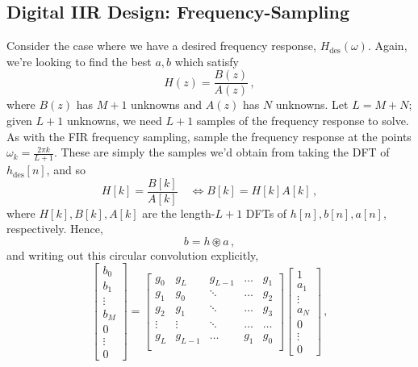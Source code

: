 \subsection{Digital IIR Design: Frequency-Sampling}
%
Consider the case where we have a desired frequency response,
$H_\mathrm{des}(\omega)$. Again, we're looking to find the best
$a, b$ which satisfy
%
\begin{displaymath}
  H(z) = \frac{B(z)}{A(z)} \,,
\end{displaymath}
%
where $B(z)$ has $M+1$ unknowns and $A(z)$ has $N$ unknowns. Let
$L = M + N$; given $L + 1$ unknowns, we need $L + 1$ samples
of the frequency response to solve. As with the FIR frequency
sampling, sample the frequency response at the points
$\omega_k = \frac{2\pi k}{L + 1}$. These are simply the samples
we'd obtain from taking the DFT of $h_\mathrm{des}[n]$, and so
%
\begin{displaymath}
  H[k] = \frac{B[k]}{A[k]} \quad\Longleftrightarrow B[k] = H[k]A[k] \,,
\end{displaymath}
%
where $H[k], B[k], A[k]$ are the length-$L+1$ DFTs of $h[n], b[n], a[n]$,
respectively. Hence,
%
\begin{displaymath}
  b = h \circledast a \,,
\end{displaymath}
%
and writing out this circular convolution explicitly,
%
\begin{displaymath}
  \left[\begin{array}{c} b_0 \\ b_1 \\ \vdots \\ b_M \\ 0 \\ \vdots \\ 0 \end{array}\right]
  =
  \left[\begin{array}{ccccc}
      g_0 & g_L & g_{L-1} & \hdots & g_1 \\
      g_1 & g_0 & \ddots  & \hdots & g_2 \\
      g_2 & g_1 & \ddots  & \hdots & g_3 \\ 
      \vdots & \vdots & \ddots & \hdots & \hdots \\
      g_L & g_{L-1} & \hdots  & g_1 & g_0 \\ 
    \end{array}\right]
  \left[\begin{array}{c} 1 \\ a_1 \\ \vdots \\ a_N \\ 0 \\ \vdots \\ 0 \end{array}\right] \,,
\end{displaymath}
